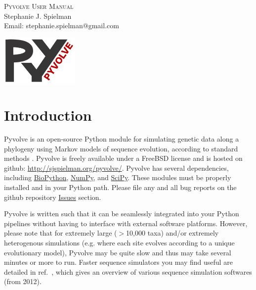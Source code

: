 \documentclass{article}
\begin{document}
\begin{titlepage}
	\begin{center}


	\textsc{\Huge Pyvolve User Manual}\\[1cm]

	{\huge Stephanie J. Spielman}\\[0.5cm]

	{\large Email: stephanie.spielman@gmail.com}

	\vspace*{1.5cm}
	\includegraphics[width=1.5in]{pyvolve_logo_manual.png}



	\end{center}


\end{titlepage}

\newpage

\tableofcontents

\newpage


\section{Introduction}

Pyvolve is an open-source Python module for simulating genetic data along a phylogeny using Markov models of sequence evolution, according to standard methods \cite{Yang2006}. Pyvolve is freely available under a FreeBSD license and is hosted on github:
\href{http://sjspielman.org/pyvolve/}{http://sjspielman.org/pyvolve/}. Pyvolve has several dependencies, including \href{http://biopython.org/wiki/Download}{BioPython}, \href{http://www.scipy.org/install.html}{NumPy}, and \href{http://www.scipy.org/install.html}{SciPy}. These modules must be properly installed and in your Python path. Please file any and all bug reports on the github repository \href{https://github.com/sjspielman/pyvolve/issues}{Issues} section.

Pyvolve is written such that it can be seamlessly integrated into your Python pipelines without having to interface with external software platforms. However, please note that for extremely large ($>$10,000 taxa) and/or extremely heterogenous simulations (e.g. where each site evolves according to a unique evolutionary model), Pyvolve may be quite slow and thus may take several minutes or more to run. Faster sequence simulators you may find useful are detailed in ref.\ \citep{Arenas2012}, which gives an overview of various sequence simulation softwares (from 2012).
\end{document}
